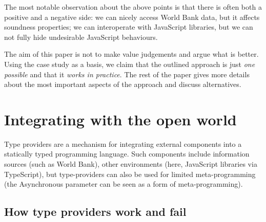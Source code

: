 \documentclass[submission,copyright,creativecommons]{eptcs}
\newcommand{\ident}[1]{\textnormal{\sffamily #1}}
\begin{document}
\noindent
The most notable observation about the above points is that there is often both a positive and
a negative side: we can nicely access World Bank data, but it affects soundness properties;
we can interoperate with JavaScript libraries, but we can not fully hide undesirable JavaScript
behaviours.

The aim of this paper is not to make value judgements and argue what is better. Using the case
study as a basis, we claim that the outlined approach is just \emph{one possible} and that it
\emph{works in practice}. The rest of the paper gives more details about the most important
aspects of the approach and discuss alternatives.



%


\section{Integrating with the open world}
\label{sec:tp}

Type providers \cite{fsharp-typeprov} are a mechanism for integrating external components into a
statically typed programming language. Such components include information sources (such as World
Bank), other environments (here, JavaScript libraries via TypeScript), but type-providers can
also be used for limited meta-programming (the \ident{Asynchronous} parameter can be seen as
a form of meta-programming).


\subsection{How type providers work and fail}
\label{sec:tp-def}
\end{document}

